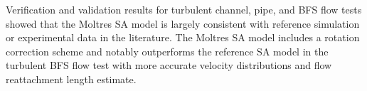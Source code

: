 Verification and validation results for turbulent channel, pipe, and \gls{BFS} flow tests showed
that the Moltres \gls{SA} model is largely consistent with reference simulation or experimental
data in the literature. The Moltres \gls{SA} model includes a rotation correction scheme
\cite{aupoix_extensions_2003, dacles-mariani_numericalexperimental_1995} and notably outperforms
the reference \gls{SA} model in the turbulent \gls{BFS} flow test with more accurate velocity
distributions and flow reattachment length estimate.
